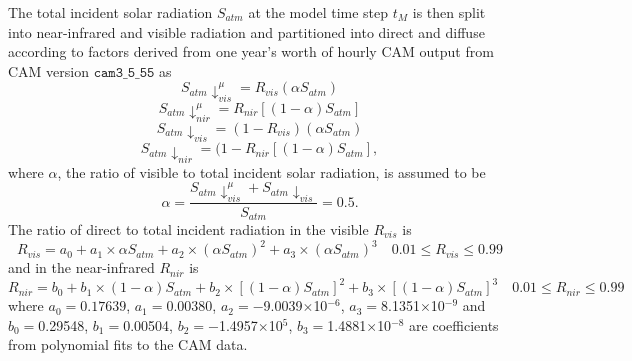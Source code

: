\documentclass[12pt,authoryear]{elsarticle}
\numberwithin{equation}{section} %
\begin{document}
The total incident solar radiation $S_{atm}$ at the model time step $t_{M}$ is then split into near-infrared and visible radiation and partitioned into direct and diffuse according to factors derived from one year’s worth of hourly CAM output from CAM version $\texttt{cam3\_5\_55}$ as 
\begin{equation}
S_{atm}\downarrow_{vis}^{\mu}=R_{vis}(\alpha S_{atm})
\end{equation}
\begin{equation}
S_{atm}\downarrow_{nir}^{\mu}=R_{nir}[(1-\alpha) S_{atm}]
\end{equation}
\begin{equation}
S_{atm}\downarrow_{vis}=(1-R_{vis})(\alpha S_{atm})
\end{equation}
\begin{equation}
S_{atm}\downarrow_{nir}=(1-R_{nir}[(1-\alpha) S_{atm}],
\end{equation}
where $\alpha$, the ratio of visible to total incident solar radiation, is assumed to be 
\begin{equation}
\alpha = \frac{S_{atm}\downarrow_{vis}^\mu+S_{atm}\downarrow_{vis}}{S_{atm}}=0.5.
\end{equation}
The ratio of direct to total incident radiation in the visible $R_{vis}$ is
\begin{equation}
R_{vis}=a_{0}+a_{1}\times\alpha S_{atm}+a_{2}\times(\alpha S_{atm})^2+a_{3}\times(\alpha S_{atm})^3 \quad 0.01\leq R_{vis} \leq 0.99
\end{equation}
and in the near-infrared $R_{nir}$ is 
\begin{equation}
R_{nir}=b_{0}+b_{1}\times(1-\alpha) S_{atm}+b_{2}\times[(1-\alpha) S_{atm}]^2+b_{3}\times[(1-\alpha) S_{atm}]^3 \quad 0.01\leq R_{nir} \leq 0.99
\end{equation}
where $a_{0}=0.17639$, $a_{1}=$0.00380, $a_{2}=-$9.0039$\times$10$^{-6}$, $a_{3}=$8.1351$\times$10$^{-9}$ and $b_{0}=$0.29548, $b_{1}=$0.00504, $b_{2}=-$1.4957$\times$10$^{5}$, $b_{3}=$1.4881$\times$10$^{-8}$ are coefficients from polynomial fits to the CAM data.
\end{document}
